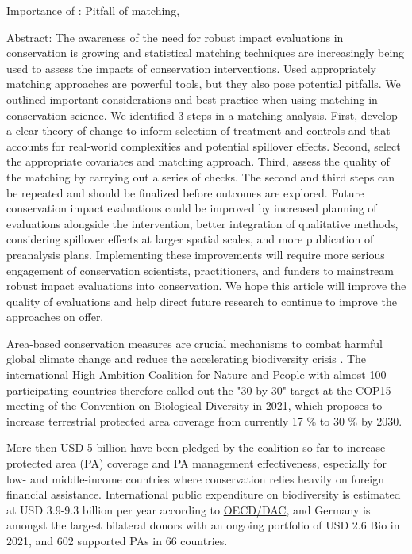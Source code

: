 \documentclass{article}
\begin{document}
Importance of \citep{schleicher2020statistical}: Pitfall of matching, 

Abstract: The awareness of the need for robust impact evaluations in conservation is growing and statistical matching techniques are increasingly being used to assess the impacts of conservation interventions. Used appropriately matching approaches are powerful tools, but they also pose potential pitfalls. We outlined important considerations and best practice when using matching in conservation science. We identified 3 steps in a matching analysis. First, develop a clear theory of change to inform selection of treatment and controls and that accounts for real-world complexities and potential spillover effects. Second, select the appropriate covariates and matching approach. Third, assess the quality of the matching by carrying out a series of checks. The second and third steps can be repeated and should be finalized before outcomes are explored. Future conservation impact evaluations could be improved by increased planning of evaluations alongside the intervention, better integration of qualitative methods, considering spillover effects at larger spatial scales, and more publication of preanalysis plans. Implementing these improvements will require more serious engagement of conservation scientists, practitioners, and funders to mainstream robust impact evaluations into conservation. We hope this article will improve the quality of evaluations and help direct future research to continue to improve the approaches on offer.


Area-based conservation measures are crucial mechanisms to combat harmful global climate change and reduce the accelerating biodiversity crisis \citep{shukla2019climate, diaz2019global}. The international  High Ambition Coalition for Nature and People with almost 100 participating countries therefore called out the "30 by 30" target at the COP15 meeting of the Convention on Biological Diversity in 2021, which proposes to increase terrestrial protected area coverage from currently 17 \% to 30 \% by 2030.

More then USD 5 billion have been pledged by the coalition so far to increase protected area (PA) coverage and PA management effectiveness, especially for low- and middle-income countries where conservation relies heavily on foreign financial assistance. International public expenditure on biodiversity is estimated at USD 3.9-9.3 billion per year according to \href{https://www.oecd.org/environment/resources/biodiversity/report-a-comprehensive-overview-of-global-biodiversity-finance.pdf}{OECD/DAC}, and Germany is amongst the largest bilateral donors with an ongoing portfolio of USD 2.6 Bio in 2021, and 602 supported PAs in 66 countries.
\end{document}
